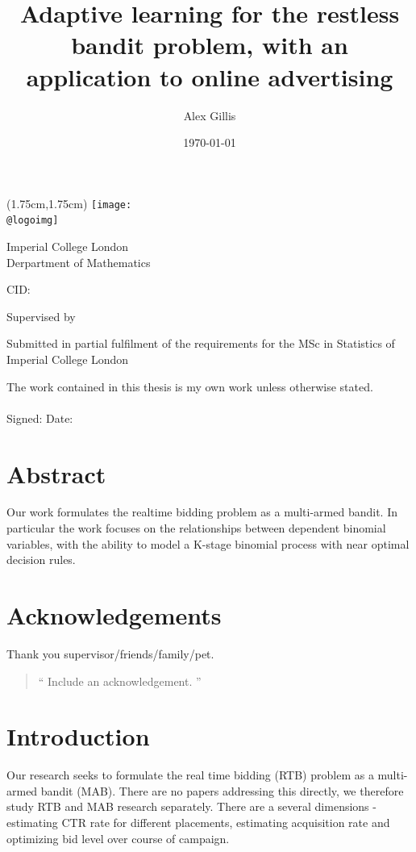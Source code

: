 \documentclass[11pt,a4,singlespacing,titlepagenumber=on]{scrreprt}
\title{Adaptive learning for the restless bandit problem, with an application to online advertising}
\author{Alex Gillis}
\date{\today}
\makeatletter
\numberwithin{equation}{chapter} %
\theoremstyle{remark}
\renewcommand{\maketitle}{
\begin{titlepage}
\ifdefined\@logoimg
\begin{textblock*}{8cm}(1.75cm,1.75cm)
\texttt{[image: \\@logoimg]}
\end{textblock*}
\vspace*{1cm}
\else
\fi
\begin{center}
\vspace*{\stretch{0.1}}
Imperial College London\\
Derpartment of Mathematics\par
\vspace*{\stretch{1}} %
{\titlefont\Huge \@title\par} %
\vspace*{\stretch{2}}
{\Large \@author \par}
\vspace*{1em}
{\large CID: \@CID \par}
\vspace*{\stretch{0.5}}
{\large Supervised by \@supervisor \par}
\vspace*{\stretch{3}}
{\Large \@date \par}
\vspace*{\stretch{1}}
{\large Submitted in partial fulfilment of the requirements for the
MSc in Statistics of Imperial College London}
\vspace*{\stretch{0.1}}
\end{center}%
\end{titlepage}%
}
\newcommand*{\declaration}{%
\vspace*{0.3\textheight}
The work contained in this thesis is my own work unless
otherwise stated.\\
\vspace*{0.1\textheight}\\
\hspace*{0.25\textwidth}Signed: \hspace{0.25\textwidth} Date:
\clearpage}
\renewenvironment{abstract}%
{\chapter*{Abstract}\thispagestyle{plain}}%
{\clearpage}
\newenvironment{myquote}%
{\begin{quote}{\Large{}``}}%
{{\Large{}''}\end{quote}}
\makeatother
\begin{document}
\maketitle %

\declaration %

\begin{abstract}

Our work formulates the realtime bidding problem as a multi-armed bandit. In particular the work focuses on the relationships between dependent binomial variables, with the ability to model a K-stage binomial process with near optimal decision rules.

\end{abstract}

\newpage
\chapter*{Acknowledgements}
Thank you supervisor/friends/family/pet.
\begin{myquote}
Include an acknowledgement.
\end{myquote}
\newpage

\renewcommand{\contentsname}{Table of Contents}
\tableofcontents
\newpage




\chapter{Introduction}

Our research seeks to formulate the real time bidding (RTB) problem as a multi-armed bandit (MAB). There are no papers addressing this directly, we therefore study RTB and MAB research separately. There are a several dimensions - estimating CTR rate for different placements, estimating acquisition rate and optimizing bid level over course of campaign.
\end{document}
